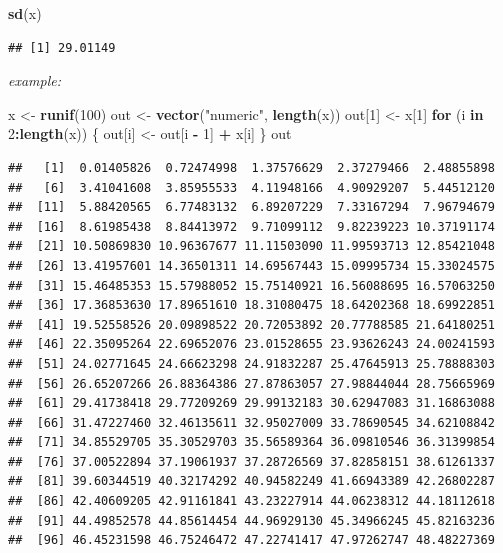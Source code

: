 \documentclass[]{book}
\newenvironment{Shaded}{\begin{snugshade}}{\end{snugshade}}
\newcommand{\ControlFlowTok}[1]{\textcolor[rgb]{0.13,0.29,0.53}{\textbf{#1}}}
\newcommand{\DecValTok}[1]{\textcolor[rgb]{0.00,0.00,0.81}{#1}}
\newcommand{\KeywordTok}[1]{\textcolor[rgb]{0.13,0.29,0.53}{\textbf{#1}}}
\newcommand{\NormalTok}[1]{#1}
\newcommand{\OperatorTok}[1]{\textcolor[rgb]{0.81,0.36,0.00}{\textbf{#1}}}
\newcommand{\StringTok}[1]{\textcolor[rgb]{0.31,0.60,0.02}{#1}}
\theoremstyle{definition}
\theoremstyle{definition}
\theoremstyle{definition}
\theoremstyle{remark}
\begin{document}
\begin{enumerate}
\begin{Shaded}
\begin{Highlighting}[]
\KeywordTok{sd}\NormalTok{(x)}
\end{Highlighting}
\end{Shaded}

\begin{verbatim}
## [1] 29.01149
\end{verbatim}

  \emph{example:}

\begin{Shaded}
\begin{Highlighting}[]
\NormalTok{x <-}\StringTok{ }\KeywordTok{runif}\NormalTok{(}\DecValTok{100}\NormalTok{)}
\NormalTok{out <-}\StringTok{ }\KeywordTok{vector}\NormalTok{(}\StringTok{"numeric"}\NormalTok{, }\KeywordTok{length}\NormalTok{(x))}
\NormalTok{out[}\DecValTok{1}\NormalTok{] <-}\StringTok{ }\NormalTok{x[}\DecValTok{1}\NormalTok{]}
\ControlFlowTok{for}\NormalTok{ (i }\ControlFlowTok{in} \DecValTok{2}\OperatorTok{:}\KeywordTok{length}\NormalTok{(x)) \{}
\NormalTok{  out[i] <-}\StringTok{ }\NormalTok{out[i }\OperatorTok{-}\StringTok{ }\DecValTok{1}\NormalTok{] }\OperatorTok{+}\StringTok{ }\NormalTok{x[i]}
\NormalTok{\}}
\NormalTok{out}
\end{Highlighting}
\end{Shaded}

\begin{verbatim}
##   [1]  0.01405826  0.72474998  1.37576629  2.37279466  2.48855898
##   [6]  3.41041608  3.85955533  4.11948166  4.90929207  5.44512120
##  [11]  5.88420565  6.77483132  6.89207229  7.33167294  7.96794679
##  [16]  8.61985438  8.84413972  9.71099112  9.82239223 10.37191174
##  [21] 10.50869830 10.96367677 11.11503090 11.99593713 12.85421048
##  [26] 13.41957601 14.36501311 14.69567443 15.09995734 15.33024575
##  [31] 15.46485353 15.57988052 15.75140921 16.56088695 16.57063250
##  [36] 17.36853630 17.89651610 18.31080475 18.64202368 18.69922851
##  [41] 19.52558526 20.09898522 20.72053892 20.77788585 21.64180251
##  [46] 22.35095264 22.69652076 23.01528655 23.93626243 24.00241593
##  [51] 24.02771645 24.66623298 24.91832287 25.47645913 25.78888303
##  [56] 26.65207266 26.88364386 27.87863057 27.98844044 28.75665969
##  [61] 29.41738418 29.77209269 29.99132183 30.62947083 31.16863088
##  [66] 31.47227460 32.46135611 32.95027009 33.78690545 34.62108842
##  [71] 34.85529705 35.30529703 35.56589364 36.09810546 36.31399854
##  [76] 37.00522894 37.19061937 37.28726569 37.82858151 38.61261337
##  [81] 39.60344519 40.32174292 40.94582249 41.66943389 42.26802287
##  [86] 42.40609205 42.91161841 43.23227914 44.06238312 44.18112618
##  [91] 44.49852578 44.85614454 44.96929130 45.34966245 45.82163236
##  [96] 46.45231598 46.75246472 47.22741417 47.97262747 48.48227369
\end{verbatim}


\end{enumerate}
\end{document}
